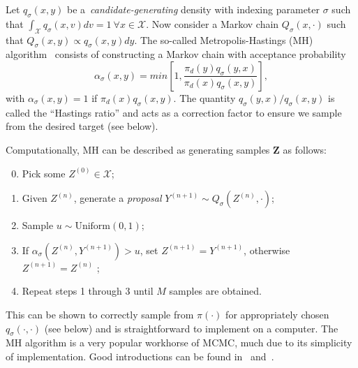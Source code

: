 Let $q_\sigma(x, y)$ be a~\textit{candidate-generating} density with indexing parameter%
$\sigma$ such that $\int_{\mathcal{X}} q_\sigma(x, v) dv = 1 \: \forall x \in \mathcal{X}$. 
Now consider a Markov chain $Q_\sigma(x, \cdot)$ such that $Q_\sigma(x, y) \propto q_\sigma(x, y) dy$.
The so-called Metropolis-Hastings (MH) algorithm~\citep{Metropolis1953,Hastings1970} consists of constructing a Markov chain with acceptance probability
\begin{equation}
 \label{eq:acceptance}
 \alpha_\sigma(x, y) = min \left[1, \frac{\pi_d(y) q_\sigma(y, x)}{\pi_d(x) q_\sigma(x, y)} \right],
\end{equation}
with $\alpha_\sigma(x, y) = 1$ if $\pi_d(x) q_\sigma(x, y)$.
The quantity $q_\sigma(y, x)/ q_\sigma(x, y)$ is called the ``Hastings ratio'' and acts as a correction factor to ensure we sample from the desired target (see below).

Computationally, MH can be described as generating samples $\boldsymbol Z$ as follows:
\begin{enumerate}
 \setcounter{enumi}{-1}
 \item Pick some $Z^{(0)} \in \mathcal{X}$;
 \item Given $Z^{(n)}$, generate a \textit{proposal} $Y^{(n + 1)} \sim Q_\sigma(Z^{(n)}, \cdot)$;
 \item Sample $u \sim \text{Uniform}(0, 1)$;
 \item If $\alpha_\sigma(Z^{(n)},  Y^{(n + 1)}) > u$, set $Z^{(n + 1)} = Y^{(n + 1)}$, otherwise $Z^{(n + 1)} = Z^{(n)}$ ;
 \item Repeat steps 1 through 3 until $M$ samples are obtained.
\end{enumerate}
This can be shown to correctly sample from $\pi(\cdot)$ for appropriately chosen $q_\sigma(\cdot, \cdot)$ (see below) and is straightforward to implement on a computer.
The MH algorithm is a very popular workhorse of MCMC, much due to its simplicity of implementation.
Good introductions can be found in~\cite{Chib1995} and~\cite{Robert2015}.

